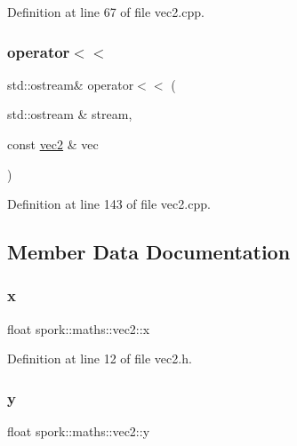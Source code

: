 Definition at line 67 of file vec2.\+cpp.

\mbox{\label{structspork_1_1maths_1_1vec2_aad9cd30e354cce297fed94cf69a1c0d7}} 
\subsubsection{\texorpdfstring{operator$<$$<$}{operator<<}}
{\footnotesize\ttfamily std\+::ostream\& operator$<$$<$ (\begin{DoxyParamCaption}\item[{std\+::ostream \&}]{stream,  }\item[{const \hyperlink{structspork_1_1maths_1_1vec2}{vec2} \&}]{vec }\end{DoxyParamCaption})\hspace{0.3cm}{\ttfamily [friend]}}



Definition at line 143 of file vec2.\+cpp.



\subsection{Member Data Documentation}
\mbox{\label{structspork_1_1maths_1_1vec2_a9101ec8c3e2125983dc92dfc33df946b}} 
\subsubsection{\texorpdfstring{x}{x}}
{\footnotesize\ttfamily float spork\+::maths\+::vec2\+::x}



Definition at line 12 of file vec2.\+h.

\mbox{\label{structspork_1_1maths_1_1vec2_a9fb4d0466eed13ffa264cdcb7239f10d}} 
\subsubsection{\texorpdfstring{y}{y}}
{\footnotesize\ttfamily float spork\+::maths\+::vec2\+::y}




